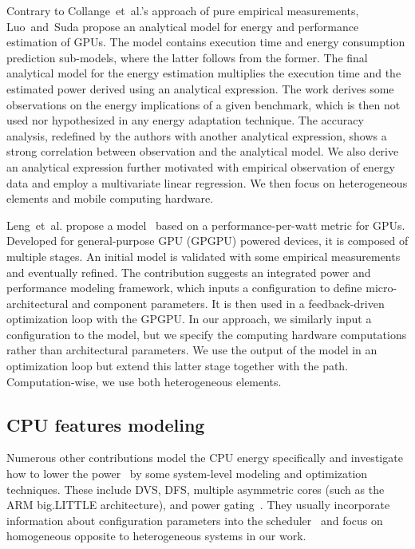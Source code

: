 Contrary to Collange~et~al.'s approach of pure empirical measurements, Luo~and~Suda\citep{luo2011performance} propose an analytical model for energy and performance estimation of GPUs. The model contains execution time and energy consumption prediction sub-models, where the latter follows from the former. The final analytical model for the energy estimation multiplies the execution time and the estimated power derived using an analytical expression. The work derives some observations on the energy implications of a given benchmark, which is then not used nor hypothesized in any energy adaptation technique. The accuracy analysis, redefined by the authors with another analytical expression, shows a strong correlation between observation and the analytical model. We also derive an analytical expression further motivated with empirical observation of energy data and employ a multivariate linear regression. We then focus on heterogeneous elements and mobile computing hardware.

Leng~et~al. propose a model~\citep{leng2013gpuwattch} based on a performance-per-watt metric for GPUs. Developed for general-purpose GPU (GPGPU) powered devices, it is composed of multiple stages. An initial model is validated with some empirical measurements and eventually refined.  The contribution suggests an integrated power and performance modeling framework, which inputs a configuration to define micro-architectural and component parameters. It is then used in a feedback-driven optimization loop with the GPGPU. In our approach, we similarly input a configuration to the model, but we specify the computing hardware computations rather than architectural parameters. We use the output of the model in an optimization loop but extend this latter stage together with the path. Computation-wise, we use both heterogeneous elements.

\subsection{CPU features modeling}
\label{sec:soa-cpu}

Numerous other contributions model the CPU energy specifically and investigate how to lower the power~\citep{hong1999power, luo2001battery, chowdhury2005static} by some system-level modeling and optimization techniques. These include DVS, DFS, multiple asymmetric cores (such as the ARM big.LITTLE architecture), and power gating~\citep{walker2017accurate}. They usually incorporate information about configuration parameters into the scheduler~\citep{seewald2019coarse} and focus on homogeneous opposite to heterogeneous systems in our work. 

